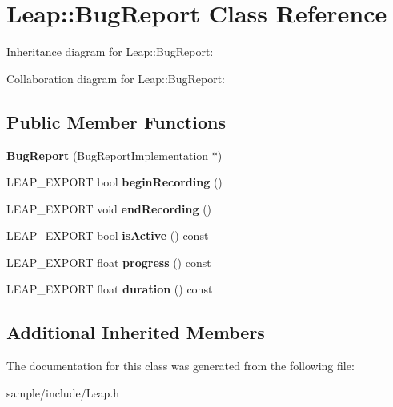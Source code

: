 \hypertarget{class_leap_1_1_bug_report}{}\section{Leap\+:\+:Bug\+Report Class Reference}
\label{class_leap_1_1_bug_report}


Inheritance diagram for Leap\+:\+:Bug\+Report\+:


Collaboration diagram for Leap\+:\+:Bug\+Report\+:
\subsection*{Public Member Functions}
\begin{DoxyCompactItemize}
\item 
\mbox{\label{class_leap_1_1_bug_report_a9861aefce4ff1f23d345c0681b56ba42}} 
{\bfseries Bug\+Report} (Bug\+Report\+Implementation $\ast$)
\item 
\mbox{\label{class_leap_1_1_bug_report_a9023f5cd43a8ccc43cbe24e95f981f6b}} 
L\+E\+A\+P\+\_\+\+E\+X\+P\+O\+RT bool {\bfseries begin\+Recording} ()
\item 
\mbox{\label{class_leap_1_1_bug_report_a0cf741fbb0bcef6690c64ec6e950525f}} 
L\+E\+A\+P\+\_\+\+E\+X\+P\+O\+RT void {\bfseries end\+Recording} ()
\item 
\mbox{\label{class_leap_1_1_bug_report_ad447a68efabb3aee42fe41e0e3a2f2dc}} 
L\+E\+A\+P\+\_\+\+E\+X\+P\+O\+RT bool {\bfseries is\+Active} () const
\item 
\mbox{\label{class_leap_1_1_bug_report_a2feb19216ba5263f0f99ef114ec240b8}} 
L\+E\+A\+P\+\_\+\+E\+X\+P\+O\+RT float {\bfseries progress} () const
\item 
\mbox{\label{class_leap_1_1_bug_report_a69df0b78d7cbfafefa0b40b3e2d3fa4c}} 
L\+E\+A\+P\+\_\+\+E\+X\+P\+O\+RT float {\bfseries duration} () const
\end{DoxyCompactItemize}
\subsection*{Additional Inherited Members}


The documentation for this class was generated from the following file\+:\begin{DoxyCompactItemize}
\item 
sample/include/Leap.\+h\end{DoxyCompactItemize}
